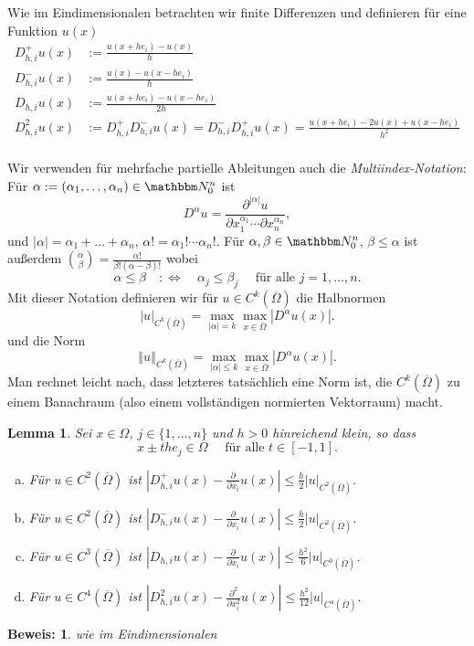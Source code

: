 \documentclass[12pt,a4paper]{book}
\theoremstyle{break}
\newtheorem{lemma}[theorem]{Lemma}
\theoremstyle{nonumberplain}
\newtheorem{beweis}{Beweis:}
\newcommand{\N}{\mathbbm N}
\newcommand{\DS}{\displaystyle}
\newcommand{\norm}[1]{\left\Vert#1\right\Vert}		%
\newcommand{\1}{\mathbbm{1}} 			      	%
\begin{document}
Wie im Eindimensionalen betrachten wir finite Differenzen und definieren für eine Funktion $u(x)$
\begin{align*}
D_{h,i}^{+} u(x)&:=\frac{u(x+he_i)-u(x)}{h}\\
D_{h,i}^{-} u(x)&:=\frac{u(x)-u(x-he_i)}{h}\\
D_{h,i} u(x)&:=\frac{u(x+he_i)-u(x-he_i)}{2h}\\
D_{h,i}^2 u(x)&:=D_{h,i}^{+} D_{h,i}^{-}  u(x)= D_{h,i}^{-} D_{h,i}^{+}  u(x)=  \frac{u(x+he_i)-2u(x) + u(x-he_i)}{h^2}\\
\end{align*}

Wir verwenden für mehrfache partielle Ableitungen auch die \emph{Multiindex-Notation}: Für $\alpha:=(\alpha_1,\ldots,\alpha_n)\in \N_0^n$ ist
\[
D^\alpha u=\frac{\partial^{|\alpha|}u}{\partial x_1^{\alpha_1}\cdots \partial x_n^{\alpha_n}},
\]
und $|\alpha|=\alpha_1+\ldots+\alpha_n$, $\alpha!=\alpha_1!\cdots \alpha_n!$. Für
$\alpha, \beta \in \N_0^n$, $\beta\leq \alpha$ ist außerdem ${\alpha \choose \beta}=\frac{\alpha!}{\beta!(\alpha-\beta)!}$ wobei
\[
\alpha\leq \beta \quad :\Longleftrightarrow \quad
\alpha_j\leq \beta_j \quad \mbox{ für alle } j=1,\ldots,n.
\]
Mit dieser Notation definieren wir für $u\in C^k(\overline\Omega)$ die Halbnormen
\[
|u|_{C^k(\overline\Omega)}=\max_{|\alpha|= k} \max_{x\in \overline\Omega} |D^\alpha u(x)|.
\]
und die Norm 
\[
\norm{u}_{C^k(\overline\Omega)}=\max_{|\alpha|\leq k} \max_{x\in \overline\Omega} |D^\alpha u(x)|.
\]
Man rechnet leicht nach, dass letzteres tatsächlich eine Norm ist, die $C^k(\overline\Omega)$ 
zu einem Banachraum (also einem vollständigen normierten Vektorraum) macht.

\begin{lemma}\label{lemma:FD_konsistenz1}
Sei $x\in \Omega$, $j\in \{1,\ldots,n \}$ und $h>0$ hinreichend klein, so dass 
\[
x\pm t h e_j\in \Omega \quad \mbox{ für alle } t\in [-1,1].
\]
\begin{enumerate}[(a)]
\item Für $u\in C^2(\overline\Omega)$ ist $\DS \left| D_{h,i}^{+} u(x) - \frac{\partial}{\partial x_i}u(x)\right| \leq \frac{h}{2} |u|_{C^2(\overline\Omega)}$.
\item Für $u\in C^2(\overline\Omega)$ ist $\DS \left| D_{h,i}^{-} u(x) - \frac{\partial}{\partial x_i}u(x)\right| \leq \frac{h}{2} |u|_{C^2(\overline\Omega)}$.
\item Für $u\in C^3(\overline\Omega)$ ist $\DS \left| D_{h,i} u(x) - \frac{\partial}{\partial x_i}u(x)\right| \leq \frac{h^2}{6} |u|_{C^3(\overline\Omega)}$.
\item Für $u\in C^4(\overline\Omega)$ ist $\DS \left| D_{h,i}^2 u(x) - \frac{\partial^2}{\partial x_i^2}u(x)\right| \leq \frac{h^2}{12} |u|_{C^4(\overline\Omega)}$.
\end{enumerate}
\end{lemma}
\begin{beweis}
wie im Eindimensionalen
\end{beweis}
\end{document}

